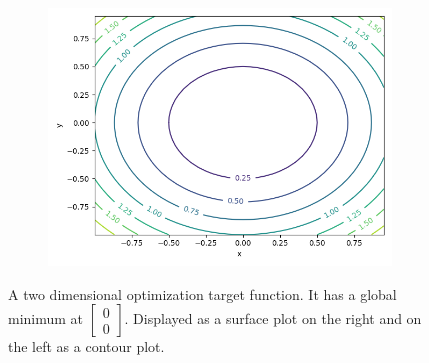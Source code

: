\begin{figure}[ht!]
    \centering
    \begin{subfigure}{0.48\textwidth}
    \end{subfigure}
    \begin{subfigure}{0.48\textwidth}
        \includegraphics[width=\textwidth]{gfx/Figures/Theory/OptimizationTargetFunctionContour.png}
    \end{subfigure}
    \caption[A two dimensional optimization target function.]{A two dimensional optimization target function. It has a global minimum at \ensuremath{\begin{bmatrix} 0\\0 \end{bmatrix}}. Displayed as a surface plot on the right and on the left as a contour plot.}
    \label{fig:theory:target-function}
\end{figure}


